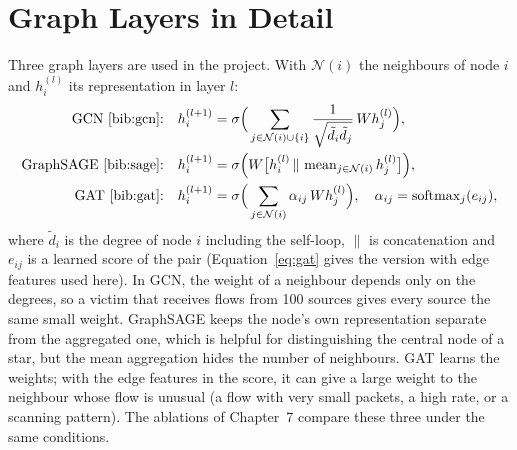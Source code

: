 \section{Graph Layers in Detail}
Three graph layers are used in the project. With $\mathcal{N}(i)$ the neighbours of node $i$ and $h_i^{(l)}$ its representation in layer $l$:
\begin{align}
\text{GCN \cite{bib:gcn}:}\quad & h_i^{(l+1)}=\sigma\Big(\sum_{j\in\mathcal{N}(i)\cup\{i\}}\frac{1}{\sqrt{\tilde d_i\tilde d_j}}\,W h_j^{(l)}\Big), \label{eq:gcn}\\
\text{GraphSAGE \cite{bib:sage}:}\quad & h_i^{(l+1)}=\sigma\Big(W\big[h_i^{(l)}\,\|\,\operatorname{mean}_{j\in\mathcal{N}(i)}h_j^{(l)}\big]\Big), \label{eq:sage}\\
\text{GAT \cite{bib:gat}:}\quad & h_i^{(l+1)}=\sigma\Big(\sum_{j\in\mathcal{N}(i)}\alpha_{ij}\,W h_j^{(l)}\Big),\quad \alpha_{ij}=\operatorname{softmax}_j(e_{ij}), \label{eq:gatsimple}
\end{align}
where $\tilde d_i$ is the degree of node $i$ including the self-loop, $\|$ is concatenation and $e_{ij}$ is a learned score of the pair (Equation~\ref{eq:gat} gives the version with edge features used here). In GCN, the weight of a neighbour depends only on the degrees, so a victim that receives flows from 100 sources gives every source the same small weight. GraphSAGE keeps the node's own representation separate from the aggregated one, which is helpful for distinguishing the central node of a star, but the mean aggregation hides the number of neighbours. GAT learns the weights; with the edge features in the score, it can give a large weight to the neighbour whose flow is unusual (a flow with very small packets, a high rate, or a scanning pattern). The ablations of Chapter~7 compare these three under the same conditions.


